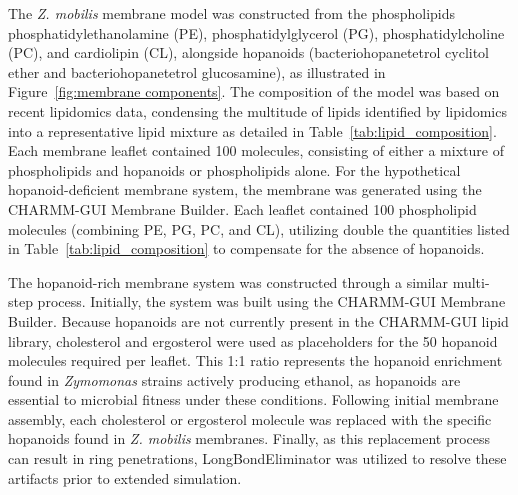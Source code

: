 The \textit{Z. mobilis} membrane model was constructed from the phospholipids phosphatidylethanolamine (PE), phosphatidylglycerol (PG), phosphatidylcholine (PC), and cardiolipin (CL), alongside hopanoids (bacteriohopanetetrol cyclitol ether and bacteriohopanetetrol glucosamine), as illustrated in Figure~\ref{fig:membrane components}.
The composition of the model was based on recent lipidomics data\cite{RiveraVazquez2024}, condensing the multitude of lipids identified by lipidomics into a representative lipid mixture as detailed in Table~\ref{tab:lipid_composition}.
Each membrane leaflet contained 100 molecules, consisting of either a mixture of phospholipids and hopanoids or phospholipids alone.
For the hypothetical hopanoid-deficient membrane system, the membrane was generated using the CHARMM-GUI Membrane Builder\cite{Lee2019b}. Each leaflet contained 100 phospholipid molecules (combining PE, PG, PC, and CL), utilizing double the quantities listed in Table~\ref{tab:lipid_composition} to compensate for the absence of hopanoids.

The hopanoid-rich membrane system was constructed through a similar multi-step process. 
Initially, the system was built using the CHARMM-GUI Membrane Builder\cite{Lee2019b}. Because hopanoids are not currently present in the CHARMM-GUI lipid library, cholesterol and ergosterol were used as placeholders for the 50 hopanoid molecules required per leaflet. 
This 1:1 ratio represents the hopanoid enrichment found in \emph{Zymomonas} strains actively producing ethanol\cite{Hermans1991}, as hopanoids are essential to microbial fitness under these conditions\cite{Brenac2019}.
Following initial membrane assembly, each cholesterol or ergosterol molecule was replaced with the specific hopanoids found in \textit{Z. mobilis} membranes\cite{Brenac2019}. 
Finally, as this replacement process can result in ring penetrations, LongBondEliminator was utilized to resolve these artifacts prior to extended simulation\cite{Sarkar2023}.






